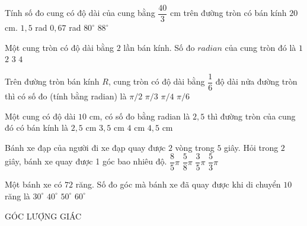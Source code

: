 \begin{ex}%
Tính số đo cung có độ dài của cung bằng $\dfrac{40}{3}$ cm trên đường tròn có bán kính $20$ cm.
\choice
{$1,5$ rad}
{\True $0,67$ rad}
{$80^{\circ}$}
{$88^{\circ}$}
\end{ex}

\begin{ex}%
Một cung tròn có độ dài bằng $2$ lần bán kính. Số đo $ radian$ của cung tròn đó là
\choice
{$1$}
{\True $2$}
{$3$}
{$4$}
\end{ex}

\begin{ex}%
Trên đường tròn bán kính $R$, cung tròn có độ dài bằng $\dfrac{1}{6}$ độ dài nửa đường tròn thì có số đo (tính bằng radian) là
\choice
{$\pi /2$}
{$\pi /3$}
{$\pi /4$}
{\True $\pi /6$}
\end{ex}

\begin{ex}%
Một cung có độ dài $10$ cm, có số đo bằng radian là $2{,}5$ thì đường tròn của cung đó có bán kính là
\choice
{$2{,}5$ cm}
{$3{,}5$ cm}
{\True $4$ cm}
{$4{,}5$ cm}
\end{ex}

\begin{ex}%
Bánh xe đạp của người đi xe đạp quay được $2$ vòng trong $5$ giây. Hỏi trong $2$ giây, bánh xe quay được 1 góc bao nhiêu độ.
\choice
{\True $\dfrac{8}{5}\pi$}
{$\dfrac{5}{8}\pi$}
{$\dfrac{3}{5}\pi$}
{$\dfrac{5}{3}\pi$}
\end{ex}

\begin{ex}%
Một bánh xe có $72$ răng. Số đo góc mà bánh xe đã quay được khi di chuyển $10$ răng là
\choice
{$30^{\circ}$}
{$40^{\circ}$}
{$50^{\circ}$}
{$60^{\circ}$} 
\end{ex}
\begin{dang}
    { GÓC LƯỢNG GIÁC}
\end{dang}

